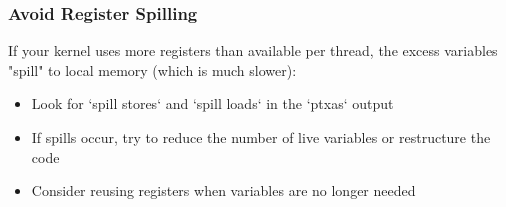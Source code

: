 \subsubsection{Avoid Register Spilling}

If your kernel uses more registers than available per thread, the excess variables "spill" to local memory (which is much slower):

\begin{itemize}
    \item Look for `spill stores` and `spill loads` in the `ptxas` output
    \item If spills occur, try to reduce the number of live variables or restructure the code
    \item Consider reusing registers when variables are no longer needed
\end{itemize}


